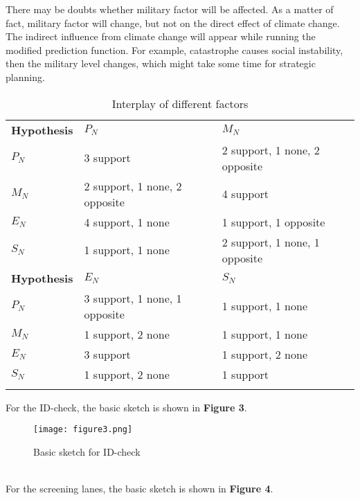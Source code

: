 \documentclass{mcmthesis}
\newlength\savedwidth
\newcommand\whline{\noalign{\global\savedwidth\arrayrulewidth
                            \global\arrayrulewidth 1.2pt}%
                   \hline
                   \noalign{\global\arrayrulewidth\savedwidth}}
\newlength\savewidth
\newcommand\shline{\noalign{\global\savewidth\arrayrulewidth
                            \global\arrayrulewidth 1.2pt}%
                   \hline
                   \noalign{\global\arrayrulewidth\savewidth}}
\begin{document}
There may be doubts whether military factor will be affected. As a matter of fact, military factor will change, but not on the direct effect of climate change. The indirect influence from climate change will appear while running the modified prediction function. For example, catastrophe causes social instability, then the military level changes, which might take some time for strategic planning.




\begin{table}[htbp]
	\renewcommand\arraystretch{1.5}
	\footnotesize
	\centering
	\begin{tabular}{m{2.7cm}<{\centering}|m{5cm}<{\centering}|m{5cm}<{\centering}}
		\whline
		\textbf{Hypothesis}&\textbf{$P_N$}&\textbf{$M_N$}\\
		\whline
		\textbf{$P_N$}&3 support &2 support, 1 none, 2 opposite\\

		\textbf{$M_N$}&2 support, 1 none, 2 opposite&4 support\\

		\textbf{$E_N$}&4 support, 1 none&1 support, 1 opposite\\

		\textbf{$S_N$}&1 support, 1 none&2 support, 1 none, 1 opposite\\
		\shline
		\textbf{Hypothesis}&\textbf{$E_N$}&\textbf{$S_N$}\\
		\whline
		\textbf{$P_N$}& 3 support, 1 none, 1 opposite & 1 support, 1 none\\

		\textbf{$M_N$}&1 support, 2 none&1 support, 1 none\\

		\textbf{$E_N$}&3 support&1 support, 2 none\\

		\textbf{$S_N$}&1 support, 2 none&1 support\\
		\shline
	\end{tabular}
	\caption{Interplay of different factors}\label{tab:Interplay of different factors}
\end{table}

For the ID-check, the basic sketch is shown in \textbf{Figure 3}.
\begin{figure}[h]
\small
\centering
\texttt{[image: figure3.png]}
\caption{Basic sketch for ID-check} \label{fig:Basic sketch for ID-check}
\end{figure}\\
For the screening lanes, the basic sketch is shown in \textbf{Figure 4}.
\end{document}
